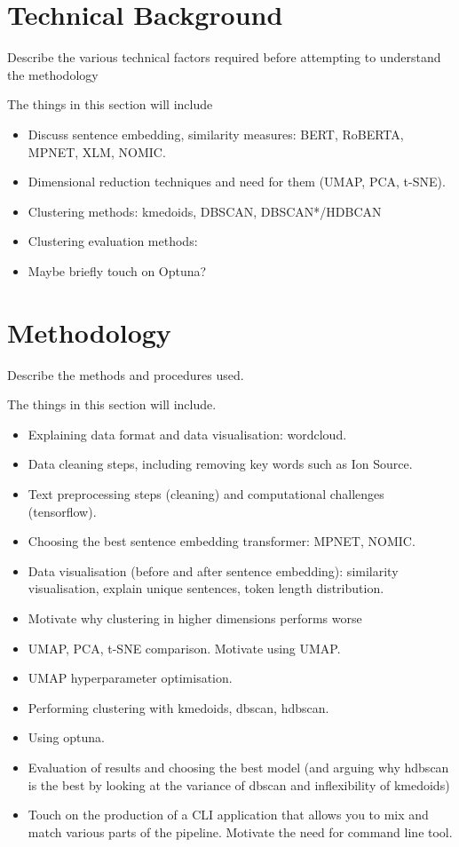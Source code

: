 \documentclass[10pt,oneside]{report}
\begin{document}
\chapter{Technical Background}
Describe the various technical factors required before attempting to understand the methodology

The things in this section will include
\begin{itemize}
    \item Discuss sentence embedding, similarity measures: BERT, RoBERTA, MPNET, XLM, NOMIC.
    \item Dimensional reduction techniques and need for them (UMAP, PCA, t-SNE).
    \item Clustering methods: kmedoids, DBSCAN, DBSCAN*/HDBCAN
    \item Clustering evaluation methods: 
    \item Maybe briefly touch on Optuna?
\end{itemize}


\chapter{Methodology}
Describe the methods and procedures used.

The things in this section will include.
\begin{itemize}
    \item Explaining data format and data visualisation: wordcloud.
    \item Data cleaning steps, including removing key words such as Ion Source.
    \item Text preprocessing steps (cleaning) and computational challenges (tensorflow).
    \item Choosing the best sentence embedding transformer: MPNET, NOMIC.
    \item Data visualisation (before and after sentence embedding): similarity visualisation, explain unique sentences, token length distribution.
    \item Motivate why clustering in higher dimensions performs worse
    \item UMAP, PCA, t-SNE comparison. Motivate using UMAP.
    \item UMAP hyperparameter optimisation.
    \item Performing clustering with kmedoids, dbscan, hdbscan.
    \item Using optuna.
    \item Evaluation of results and choosing the best model (and arguing why hdbscan is the best by looking at the variance of dbscan and inflexibility of kmedoids)
    \item Touch on the production of a CLI application that allows you to mix and match various parts of the pipeline. Motivate the need for command line tool.
\end{itemize}
\end{document}
